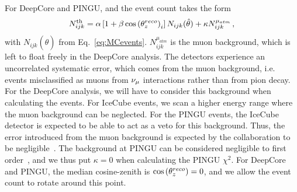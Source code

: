 For DeepCore and PINGU, and the event count takes the form
\begin{align}
    N^\text{th}_{ijk} = \alpha\left[1+\beta \cos{(\theta_z^{reco})}_i \right] N_{ijk}(\hat{\theta}) + \kappa N_{ijk}^{\mu_{atm}}\,,
\end{align}
with $N_{ijk}(\hat{\theta})$ from Eq.~\ref{eq:MCevents}. $N_{ijk}^{\mu_{atm}}$ is the muon background, which is left to float freely in the DeepCore analysis.
The detectors experience an uncorrelated systematic error, which comes from the muon background, 
i.e. events misclassified as muons from 
$\nu_\mu$ interactions rather than from pion decay. For the DeepCore analysis, we will have to consider this background when calculating the events.
For IceCube events, we scan a higher energy range where the muon background can be neglected. For the PINGU events, the IceCube detector is 
expected to be able to act as a veto for this background. Thus, the error introduced from the muon background is expected by the collaboration 
to be negligible~\cite{PINGUletter}.
The background at PINGU can be considered negligible to first order~\cite{PINGUdata}, and we thus put $\kappa=0$ when calculating the PINGU $\chi^2$.
For DeepCore and PINGU, the median cosine-zenith is $\cos{(\theta_z^{reco})} = 0$, and we allow the event count to rotate around this point.

